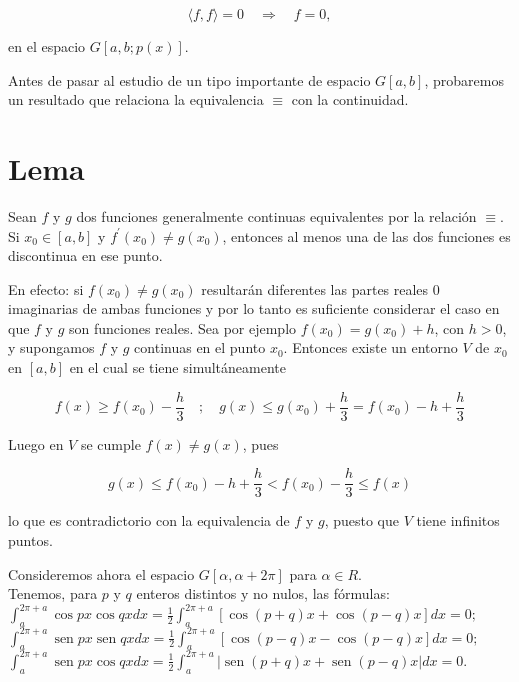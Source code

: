 \documentclass[10pt]{article}
\theoremstyle{plain}
\theoremstyle{definition}
\theoremstyle{remark}
\begin{document}
$$
\langle f, f\rangle=0 \quad \Rightarrow \quad f=0,
$$

en el espacio $G[a, b ; p(x)]$.


Antes de pasar al estudio de un tipo importante de espacio $G[a, b]$, probaremos un resultado que relaciona la equivalencia $\equiv$ con la continuidad.

\section*{Lema}
Sean $f$ y $g$ dos funciones generalmente continuas equivalentes por la relación $\equiv$. Si $x_{0} \in[a, b]$ y $f^{\prime}\left(x_{0}\right) \neq g\left(x_{0}\right)$, entonces al menos una de las dos funciones es discontinua en ese punto.

En efecto: si $f\left(x_{0}\right) \neq g\left(x_{0}\right)$ resultarán diferentes las partes reales 0 imaginarias de ambas funciones y por lo tanto es suficiente considerar el caso en que $f$ y $g$ son funciones reales. Sea por ejemplo $f\left(x_{0}\right)=g\left(x_{0}\right)+h$, con $h>0$, y supongamos $f$ y $g$ continuas en el punto $x_{0}$. Entonces existe un entorno $V$ de $x_{0}$ en $[a, b]$ en el cual se tiene simultáneamente

$$
f(x) \geqslant f\left(x_{0}\right)-\frac{h}{3} \quad ; \quad g(x) \leqslant g\left(x_{0}\right)+\frac{h}{3}=f\left(x_{0}\right)-h+\frac{h}{3}
$$

Luego en $V$ se cumple $f(x) \neq g(x)$, pues

$$
g(x) \leqslant f\left(x_{0}\right)-h+\frac{h}{3}<f\left(x_{0}\right)-\frac{h}{3} \leqslant f(x)
$$

lo que es contradictorio con la equivalencia de $f$ y $g$, puesto que $V$ tiene infinitos puntos.

Consideremos ahora el espacio $G[\alpha, \alpha+2 \pi]$ para $\alpha \in R$.\\
Tenemos, para $p$ y $q$ enteros distintos y no nulos, las fórmulas:\\
$\int_{a}^{2 \pi+a} \cos p x \cos q x d x=\frac{1}{2} \int_{a}^{2 \pi+a}[\cos (p+q) x+\cos (p-q) x] d x=0 ;$\\
$\int_{a}^{2 \pi+a} \operatorname{sen} p x \operatorname{sen} q x d x=\frac{1}{2} \int_{a}^{2 \pi+a}[\cos (p-q) x-\cos (p-q) x] d x=0 ;$\\
$\int_{a}^{2 \pi+a} \operatorname{sen} p x \cos q x d x=\frac{1}{2} \int_{a}^{2 \pi+a}|\operatorname{sen}(p+q) x+\operatorname{sen}(p-q) x| d x=0$.
\end{document}
